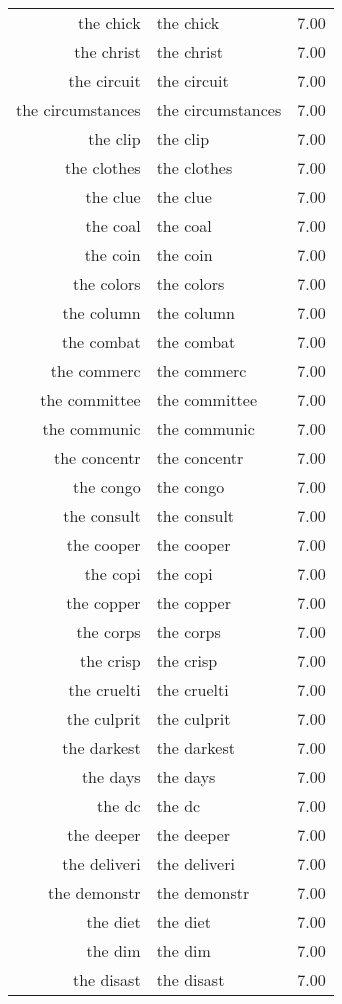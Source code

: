 \begin{table}[ht]
\begin{tabular}{rlr}
  the chick & the chick & 7.00 \\ 
  the christ & the christ & 7.00 \\ 
  the circuit & the circuit & 7.00 \\ 
  the circumstances & the circumstances & 7.00 \\ 
  the clip & the clip & 7.00 \\ 
  the clothes & the clothes & 7.00 \\ 
  the clue & the clue & 7.00 \\ 
  the coal & the coal & 7.00 \\ 
  the coin & the coin & 7.00 \\ 
  the colors & the colors & 7.00 \\ 
  the column & the column & 7.00 \\ 
  the combat & the combat & 7.00 \\ 
  the commerc & the commerc & 7.00 \\ 
  the committee & the committee & 7.00 \\ 
  the communic & the communic & 7.00 \\ 
  the concentr & the concentr & 7.00 \\ 
  the congo & the congo & 7.00 \\ 
  the consult & the consult & 7.00 \\ 
  the cooper & the cooper & 7.00 \\ 
  the copi & the copi & 7.00 \\ 
  the copper & the copper & 7.00 \\ 
  the corps & the corps & 7.00 \\ 
  the crisp & the crisp & 7.00 \\ 
  the cruelti & the cruelti & 7.00 \\ 
  the culprit & the culprit & 7.00 \\ 
  the darkest & the darkest & 7.00 \\ 
  the days & the days & 7.00 \\ 
  the dc & the dc & 7.00 \\ 
  the deeper & the deeper & 7.00 \\ 
  the deliveri & the deliveri & 7.00 \\ 
  the demonstr & the demonstr & 7.00 \\ 
  the diet & the diet & 7.00 \\ 
  the dim & the dim & 7.00 \\ 
  the disast & the disast & 7.00 \\ 

\end{tabular}
\end{table}
